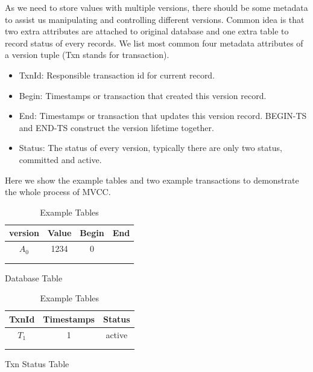As we need to store values with multiple versions, there should be some metadata to assist us manipulating and controlling different versions. Common idea is that two extra attributes are attached to original database and one extra table to record status of every records. We list most common four metadata attributes of a version tuple (Txn stands for transaction).
\begin{itemize}
	\item TxnId: Responsible transaction id for current record.
	\item Begin: Timestamps or transaction that created this version record.
	\item End: Timestamps or transaction that updates this version record. BEGIN-TS and END-TS construct the version lifetime together.
	\item Status: The status of every version, typically there are only two status, committed and active.
\end{itemize}
Here we show the example tables and two example transactions to demonstrate the whole process of MVCC.

\begin{table}
	\parbox{.45\linewidth}{
		\centering
		\begin{tabular}{|c|c|c|c|}
			\hline
			version&Value&Begin&End\\\hline
			$A_0$&1234&0& \\\hline
			&&&\\\hline
			&&&\\\hline
		\end{tabular}
		\caption*{Database Table}
	}
	\hfill
	\parbox{.45\linewidth}{
		\begin{tabular}{|c|c|c|}
			\hline
			TxnId&Timestamps&Status\\\hline
			$T_1$&1&active \\\hline
			&&\\\hline
			&&\\\hline
		\end{tabular}
		\caption*{Txn Status Table}
	}
\caption{Example Tables\label{table1}}
\end{table}

